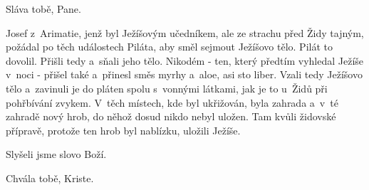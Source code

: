 \rubricatum{\Rbardot{}} Sláva tobě, Pane.

Josef z~Arimatie, jenž byl Ježíšovým učedníkem, ale ze strachu před Židy
tajným, požádal po těch událostech Piláta, aby směl sejmout Ježíšovo tělo.
Pilát to dovolil. Přišli tedy a~sňali jeho tělo. Nikodém - ten, který
předtím vyhledal Ježíše v~noci - přišel také a~přinesl směs myrhy a~aloe,
asi sto liber. Vzali tedy Ježíšovo tělo a~zavinuli je do pláten spolu
s~vonnými látkami, jak je to u~Židů při pohřbívání zvykem. V~těch místech, kde
byl ukřižován, byla zahrada a~v~té zahradě nový hrob, do něhož dosud nikdo
nebyl uložen. Tam kvůli židovské přípravě, protože ten hrob byl nablízku,
uložili Ježíše.

Slyšeli jsme slovo Boží.

\rubricatum{\Rbardot{}} Chvála tobě, Kriste.
